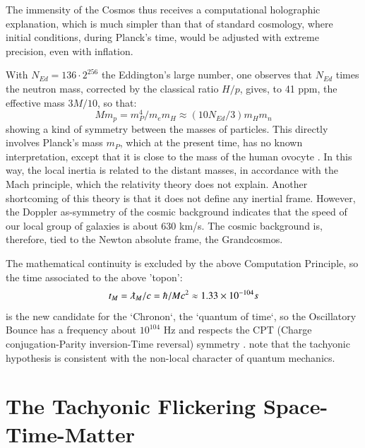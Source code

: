 \documentclass[twoside,draft]{article}
\begin{document}
\begin{sloppypar}
The immensity of the Cosmos thus receives a computational holographic explanation, which is much simpler than that of standard cosmology, where initial conditions, during Planck's time, would be adjusted with extreme precision, even with inflation. 

With $N_{Ed} = 136 \cdot2^{256}$ the Eddington's large number, one observes that $N_{Ed}$ times the neutron mass, corrected by the classical ratio $H/p$, gives, to 41 ppm, the effective mass $3M/10$, so that:
\begin{equation}
Mm_p = m_P^4/m_em_H\approx(10N_{Ed}/3)m_Hm_n 
\end{equation}
showing a kind of symmetry between the masses of particles. This directly involves Planck's mass $m_{P}$, which at the present time, has no known interpretation, except that it is close to the mass of the human ovocyte \cite{Sanchez1}. In this way, the local inertia is related to the distant masses, in accordance with the Mach principle, which the relativity theory does not explain. Another shortcoming of this theory is that it does not define any inertial frame. However, the Doppler as-symmetry of the cosmic background indicates that the speed of our local group of galaxies is about 630 km/s. The cosmic background is, therefore, tied to the Newton absolute frame, the Grandcosmos.

The mathematical continuity is excluded by the above Computation Principle, so the time associated to the above 'topon': 
\begin{equation}
t_M = \lambdabar_{M} /c = \hbar/Mc^2 \approx 1.33 \times 10^{-104}s 
\end{equation}
is the new candidate for the `Chronon`, the `quantum of time`, so the Oscillatory Bounce has a frequency about $10^{104}$ Hz  \cite{Sanchez2} and respects the CPT (Charge conjugation-Parity inversion-Time reversal) symmetry \cite{Sanchez1}. note that the tachyonic hypothesis is consistent with the non-local character of quantum mechanics.

\section{The Tachyonic Flickering Space-Time-Matter}


\end{sloppypar}
\end{document}
